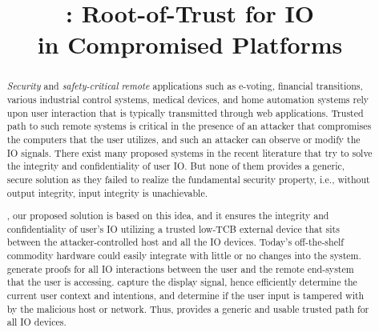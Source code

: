 \newif\ifccs
\ccsfalse

\ifccs

\else

\fi



\newif\ifdesperatetime

\graphicspath{{images/}}


\title{\name: Root-of-Trust for IO \\ in Compromised Platforms}

\ifccs
\else
\maketitle
\fi

\begin{abstract}
 

\emph{Security} and \emph{safety-critical} \emph{remote} applications such as e-voting, financial transitions, various industrial control systems, medical devices, and home automation systems rely upon user interaction that is typically transmitted through web applications. Trusted path to such remote systems is critical in the presence of an attacker that compromises the computers that the user utilizes, and such an attacker can observe or modify the IO signals. There exist many proposed systems in the recent literature that try to solve the integrity and confidentiality of user IO. But none of them provides a generic, secure solution as they failed to realize the fundamental security property, i.e., without output integrity, input integrity is unachievable.    

\name, our proposed solution is based on this idea, and it ensures the integrity and confidentiality of user's IO utilizing a trusted low-TCB external device that sits between the attacker-controlled host and all the IO devices. Today's off-the-shelf commodity hardware could easily integrate \name with little or no changes into the system. \name generate proofs for all IO interactions between the user and the remote end-system that the user is accessing. \name capture the display signal, hence efficiently determine the current user context and intentions, and determine if the user input is tampered with by the malicious host or network. Thus, \name provides a generic and usable trusted path for all IO devices.

\end{abstract}


